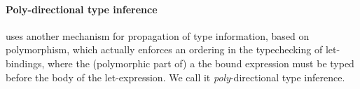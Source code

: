 \documentclass[acmsmall,screen,nonacm]{acmart}
\begin{document}
\paragraph{Poly-directional type inference}

\OCaml uses another mechanism for propagation of type
information, based on polymorphism, which actually enforces an ordering in
the typechecking of let-bindings, where the (polymorphic part of) a the
bound expression must be typed before the body of the let-expression.
We call it \emph{poly}-directional type inference. 
\end{document}
